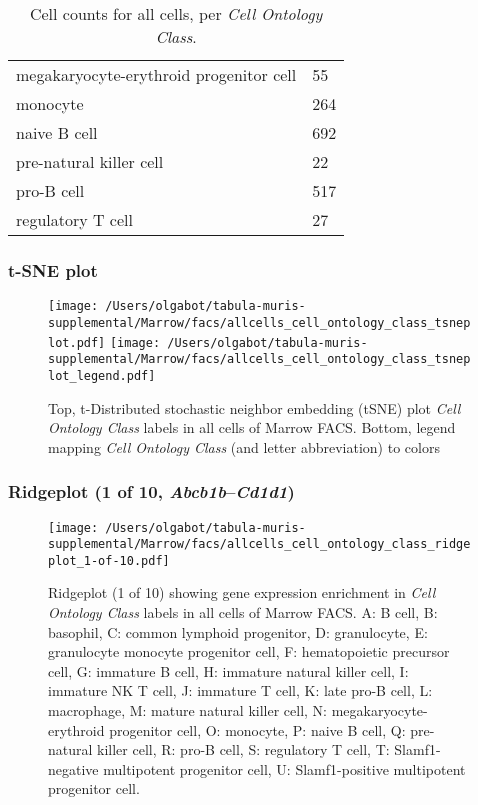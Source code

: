 \begin{table}[h]
\begin{tabular}{@{}ll@{}}
megakaryocyte-erythroid progenitor cell & 55 \\

monocyte & 264 \\

naive B cell & 692 \\

pre-natural killer cell & 22 \\

pro-B cell & 517 \\

regulatory T cell & 27 \\
\bottomrule
\end{tabular}
\caption{Cell counts for all cells, per \emph{Cell Ontology Class}.}
\end{table}

\clearpage
\subsubsection{t-SNE plot}
\begin{figure}[h]
\centering
\texttt{[image: /Users/olgabot/tabula-muris-supplemental/Marrow/facs/allcells\_cell\_ontology\_class\_tsneplot.pdf]}
\texttt{[image: /Users/olgabot/tabula-muris-supplemental/Marrow/facs/allcells\_cell\_ontology\_class\_tsneplot\_legend.pdf]}
\caption{Top, t-Distributed stochastic neighbor embedding (tSNE) plot  \emph{Cell Ontology Class} labels in all cells of Marrow FACS. Bottom, legend mapping \emph{Cell Ontology Class} (and letter abbreviation) to colors}
\end{figure}


\clearpage

\subsubsection{Ridgeplot (1 of 10, \emph{Abcb1b}--\emph{Cd1d1})}
\begin{figure}[h]
\centering
\texttt{[image: /Users/olgabot/tabula-muris-supplemental/Marrow/facs/allcells\_cell\_ontology\_class\_ridgeplot\_1-of-10.pdf]}

\caption{ Ridgeplot (1 of 10)  showing gene expression enrichment in \emph{Cell Ontology Class} labels in all cells of Marrow FACS. A: B cell, B: basophil, C: common lymphoid progenitor, D: granulocyte, E: granulocyte monocyte progenitor cell, F: hematopoietic precursor cell, G: immature B cell, H: immature natural killer cell, I: immature NK T cell, J: immature T cell, K: late pro-B cell, L: macrophage, M: mature natural killer cell, N: megakaryocyte-erythroid progenitor cell, O: monocyte, P: naive B cell, Q: pre-natural killer cell, R: pro-B cell, S: regulatory T cell, T: Slamf1-negative multipotent progenitor cell, U: Slamf1-positive multipotent progenitor cell.}
\end{figure}


